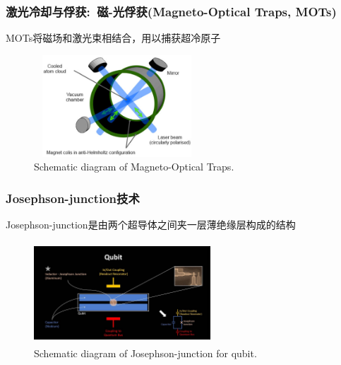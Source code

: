 \begin{frame}
	\frametitle{激光冷却与俘获:~磁-光俘获\textrm{(Magneto-Optical Traps, MOTs)}}
	\textrm{MOTs}将磁场和激光束相结合，用以捕获超冷原子
    \begin{figure}
        \centering
                \includegraphics[height=1.5in, width=2.45in, viewport=0 0 500 341,clip]{Figures/Atom-MOT-and-laser-cooling_MOTs.png}
		\caption{\tiny{\textrm{Schematic diagram of Magneto-Optical Traps.}}}
		\label{Fig:Atom-MOT-and-laser-cooling_MOTs}
    \end{figure}
	    \vskip -10pt
    {\fontsize{7.5pt}{5.2pt}\selectfont{由多束对向激光束构成稳定的区域，并利用磁场将原子约束在该区域:\\
    原子在该区域内运动时，将感受到指向激光束束心的回复力。由此将形成冷原子凝聚云，并可以长期保持}}
\end{frame}

\begin{frame}
	\frametitle{\textrm{Josephson-junction}技术}
		    \textrm{Josephson-junction}是由两个超导体之间夹一层薄绝缘层构成的结构\\
		    {\fontsize{7.5pt}{5.2pt}}
    \begin{figure}
        \centering
                \includegraphics[height=1.5in, width=2.6in, viewport=0 0 1400 744,clip]{Figures/Schematic-Josephson_junction-for-qubit.jpg}
		\caption{\tiny{\textrm{Schematic diagram of Josephson-junction for qubit.}}}
		\label{Fig:Josephson-junction}
    \end{figure}
	    \vskip -10pt
    {\fontsize{7.5pt}{5.2pt}}
\end{frame}

